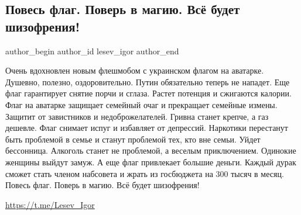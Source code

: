  
 
 
 
 
 
\subsection{Повесь флаг. Поверь в магию. Всё будет шизофрения!}
\label{sec:25_01_2022.fb.lesev_igor.1.flag_magia_shizofrenia}
 
\ifcmt
 author_begin
   author_id lesev_igor
 author_end
\fi


Очень вдохновлен новым флешмобом с украинском флагом на аватарке. Душевно,
полезно, оздоровительно. Путин обязательно теперь не нападет. Еще флаг
гарантирует снятие порчи и сглаза. Растет потенция и сжигаются калории. Флаг на
аватарке защищает семейный очаг и прекращает семейные измены. Защитит от
завистников и недоброжелателей. Гривна станет крепче, а газ дешевле. Флаг
снимает испуг и избавляет от депрессий. Наркотики перестанут быть проблемой в
семье и станут проблемой тех, кто вне семьи. Уйдет бессонница. Алкоголь станет
не проблемой, а веселым приключением. Одинокие женщины выйдут замуж. А еще флаг
привлекает большие деньги. Каждый дурак сможет стать членом набсовета и жрать
из госбюджета на 300 тысяч в месяц. Повесь флаг. Поверь в магию. Всё будет
шизофрения!

\url{https://t.me/Lesev_Igor}

